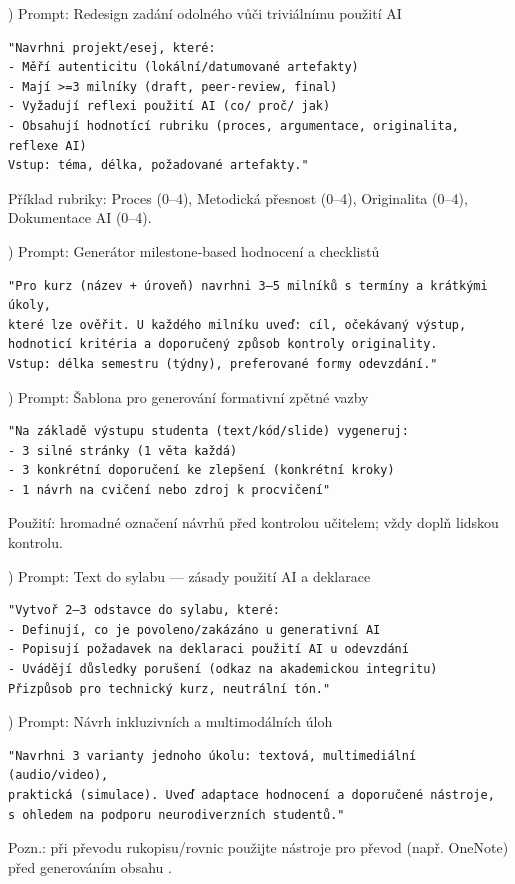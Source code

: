 \documentclass{report}%
\begin{document}
\medskip
{}) Prompt: Redesign zadání odolného vůči triviálnímu použití AI
\begin{verbatim}
"Navrhni projekt/esej, které:
- Měří autenticitu (lokální/datumované artefakty)
- Mají >=3 milníky (draft, peer-review, final)
- Vyžadují reflexi použití AI (co/ proč/ jak)
- Obsahují hodnotící rubriku (proces, argumentace, originalita, reflexe AI)
Vstup: téma, délka, požadované artefakty."
\end{verbatim}
Příklad rubriky: Proces (0–4), Metodická přesnost (0–4), Originalita (0–4), Dokumentace AI (0–4).

\medskip
{}) Prompt: Generátor milestone‑based hodnocení a checklistů
\begin{verbatim}
"Pro kurz (název + úroveň) navrhni 3–5 milníků s termíny a krátkými úkoly,
které lze ověřit. U každého milníku uveď: cíl, očekávaný výstup,
hodnoticí kritéria a doporučený způsob kontroly originality.
Vstup: délka semestru (týdny), preferované formy odevzdání."
\end{verbatim}

\medskip
{}) Prompt: Šablona pro generování formativní zpětné vazby
\begin{verbatim}
"Na základě výstupu studenta (text/kód/slide) vygeneruj:
- 3 silné stránky (1 věta každá)
- 3 konkrétní doporučení ke zlepšení (konkrétní kroky)
- 1 návrh na cvičení nebo zdroj k procvičení"
\end{verbatim}
Použití: hromadné označení návrhů před kontrolou učitelem; vždy doplň lidskou kontrolu.

\medskip
{}) Prompt: Text do sylabu — zásady použití AI a deklarace
\begin{verbatim}
"Vytvoř 2–3 odstavce do sylabu, které:
- Definují, co je povoleno/zakázáno u generativní AI
- Popisují požadavek na deklaraci použití AI u odevzdání
- Uvádějí důsledky porušení (odkaz na akademickou integritu)
Přizpůsob pro technický kurz, neutrální tón."
\end{verbatim}

\medskip
{}) Prompt: Návrh inkluzivních a multimodálních úloh
\begin{verbatim}
"Navrhni 3 varianty jednoho úkolu: textová, multimediální (audio/video),
praktická (simulace). Uveď adaptace hodnocení a doporučené nástroje,
s ohledem na podporu neurodiverzních studentů."
\end{verbatim}
Pozn.: při převodu rukopisu/rovnic použijte nástroje pro převod (např. OneNote) před generováním obsahu \cite{kb_ai_101_tipu_pdf_04e4a115_page_8_1}.
\end{document}
